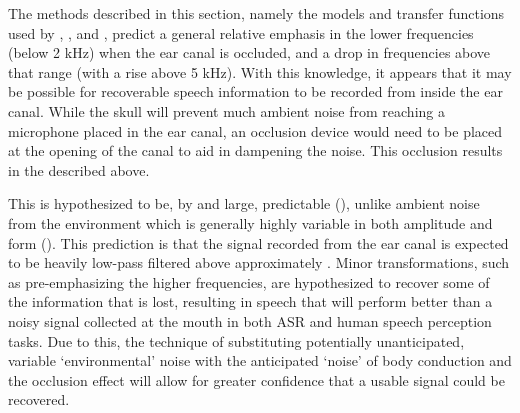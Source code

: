 


The methods described in this section, namely the models and transfer functions used by \cite{hansen:97b}, \cite{stenfelt:07}, and \cite{reinfeldt:10}, predict a general relative emphasis in the lower frequencies (below 2 kHz) when the ear canal is occluded, and a drop in frequencies above that range (with a rise above 5 kHz).  With this knowledge, it appears that it may be possible for recoverable speech information to be recorded from inside the ear canal.  While the skull will prevent much ambient noise from reaching a microphone placed in the ear canal, an occlusion device would need to be placed at the opening of the canal to aid in dampening the noise.  This occlusion results in the \DIFdelbegin {}\DIFdelend \DIFaddbegin {}\DIFaddend described above.

This \DIFdelbegin {}\DIFdelend \DIFaddbegin {}\DIFaddend is hypothesized to be, by and large, predictable (\cite{hansen:97b,reinfeldt:10}), unlike ambient noise from the environment which is generally highly variable in both amplitude and form (\cite{zhang:17}). This prediction is that the signal recorded from the ear canal is expected to be heavily low-pass filtered above approximately \DIFdelbegin {}\DIFdelend \DIFaddbegin {}\DIFaddend .  Minor transformations, such as pre-emphasizing the higher frequencies, are hypothesized to recover some of the information that is lost, resulting in speech that will perform better than a noisy signal collected at the mouth in both ASR and human speech perception tasks.
Due to this, the technique of substituting potentially unanticipated, variable `environmental' noise with the anticipated `noise' of body conduction and the occlusion effect will allow for greater confidence that a usable signal could be recovered.    

